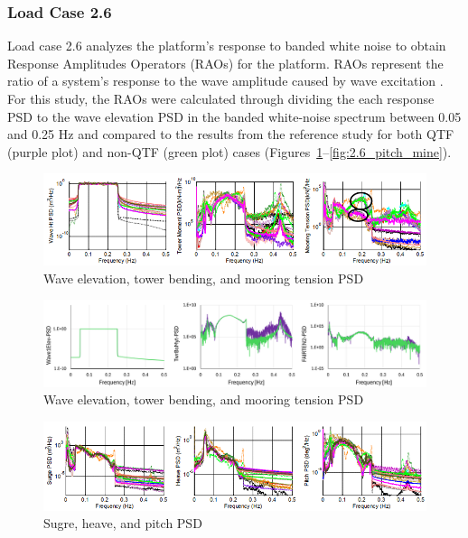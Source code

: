 \documentclass[a4paper, 11pt]{article}
\begin{document}
\subsubsection{Load Case 2.6}
\hspace*{0.5cm}Load case 2.6 analyzes the platform's response to banded white noise to obtain Response Amplitudes Operators (RAOs) for the platform. RAOs represent the ratio of a system's response to the wave amplitude caused by wave excitation \cite{RAO}. For this study, the RAOs were calculated through dividing the each response PSD to the wave elevation PSD in the banded white-noise spectrum between 0.05 and 0.25 Hz and compared to the results from the reference study for both QTF (purple plot) and non-QTF (green plot) cases (Figures~\ref{fig:w_t_t_p}--\ref{fig:2.6_pitch_mine}).

\begin{figure}[H]
    \centering
    \includegraphics[width=1\textwidth]{w_t_t_p.png}
    \caption{\small Wave elevation, tower bending, and mooring tension PSD \cite{Robertson2014}}
    \label{fig:w_t_t_p}
\end{figure}

\begin{figure}[H]
    \centering
    \includegraphics[width=1\textwidth]{wave_twr_ten_psd.png}
    \caption{\small Wave elevation, tower bending, and mooring tension PSD}
    \label{fig:w_t_t_p_mine}
\end{figure}

\begin{figure}[H]
    \centering
    \includegraphics[width=1\textwidth]{s_h_p_p.png}
    \caption{\small Sugre, heave, and pitch PSD \cite{Robertson2014}}
    \label{fig:s_h_p_p}
\end{figure}
\end{document}
